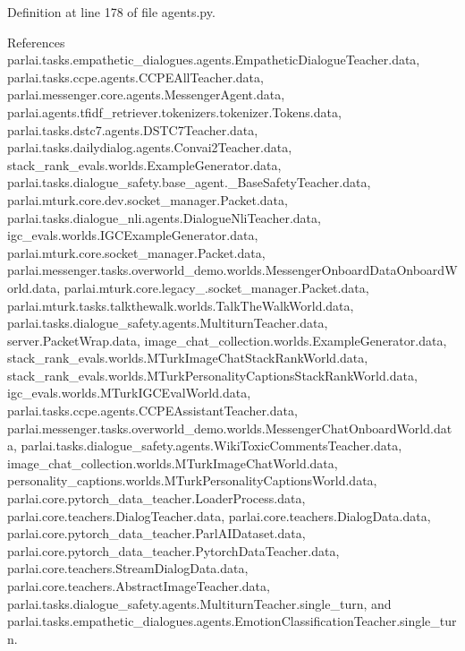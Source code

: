 Definition at line 178 of file agents.\+py.



References parlai.\+tasks.\+empathetic\+\_\+dialogues.\+agents.\+Empathetic\+Dialogue\+Teacher.\+data, parlai.\+tasks.\+ccpe.\+agents.\+C\+C\+P\+E\+All\+Teacher.\+data, parlai.\+messenger.\+core.\+agents.\+Messenger\+Agent.\+data, parlai.\+agents.\+tfidf\+\_\+retriever.\+tokenizers.\+tokenizer.\+Tokens.\+data, parlai.\+tasks.\+dstc7.\+agents.\+D\+S\+T\+C7\+Teacher.\+data, parlai.\+tasks.\+dailydialog.\+agents.\+Convai2\+Teacher.\+data, stack\+\_\+rank\+\_\+evals.\+worlds.\+Example\+Generator.\+data, parlai.\+tasks.\+dialogue\+\_\+safety.\+base\+\_\+agent.\+\_\+\+Base\+Safety\+Teacher.\+data, parlai.\+mturk.\+core.\+dev.\+socket\+\_\+manager.\+Packet.\+data, parlai.\+tasks.\+dialogue\+\_\+nli.\+agents.\+Dialogue\+Nli\+Teacher.\+data, igc\+\_\+evals.\+worlds.\+I\+G\+C\+Example\+Generator.\+data, parlai.\+mturk.\+core.\+socket\+\_\+manager.\+Packet.\+data, parlai.\+messenger.\+tasks.\+overworld\+\_\+demo.\+worlds.\+Messenger\+Onboard\+Data\+Onboard\+World.\+data, parlai.\+mturk.\+core.\+legacy\+\_.\+socket\+\_\+manager.\+Packet.\+data, parlai.\+mturk.\+tasks.\+talkthewalk.\+worlds.\+Talk\+The\+Walk\+World.\+data, parlai.\+tasks.\+dialogue\+\_\+safety.\+agents.\+Multiturn\+Teacher.\+data, server.\+Packet\+Wrap.\+data, image\+\_\+chat\+\_\+collection.\+worlds.\+Example\+Generator.\+data, stack\+\_\+rank\+\_\+evals.\+worlds.\+M\+Turk\+Image\+Chat\+Stack\+Rank\+World.\+data, stack\+\_\+rank\+\_\+evals.\+worlds.\+M\+Turk\+Personality\+Captions\+Stack\+Rank\+World.\+data, igc\+\_\+evals.\+worlds.\+M\+Turk\+I\+G\+C\+Eval\+World.\+data, parlai.\+tasks.\+ccpe.\+agents.\+C\+C\+P\+E\+Assistant\+Teacher.\+data, parlai.\+messenger.\+tasks.\+overworld\+\_\+demo.\+worlds.\+Messenger\+Chat\+Onboard\+World.\+data, parlai.\+tasks.\+dialogue\+\_\+safety.\+agents.\+Wiki\+Toxic\+Comments\+Teacher.\+data, image\+\_\+chat\+\_\+collection.\+worlds.\+M\+Turk\+Image\+Chat\+World.\+data, personality\+\_\+captions.\+worlds.\+M\+Turk\+Personality\+Captions\+World.\+data, parlai.\+core.\+pytorch\+\_\+data\+\_\+teacher.\+Loader\+Process.\+data, parlai.\+core.\+teachers.\+Dialog\+Teacher.\+data, parlai.\+core.\+teachers.\+Dialog\+Data.\+data, parlai.\+core.\+pytorch\+\_\+data\+\_\+teacher.\+Parl\+A\+I\+Dataset.\+data, parlai.\+core.\+pytorch\+\_\+data\+\_\+teacher.\+Pytorch\+Data\+Teacher.\+data, parlai.\+core.\+teachers.\+Stream\+Dialog\+Data.\+data, parlai.\+core.\+teachers.\+Abstract\+Image\+Teacher.\+data, parlai.\+tasks.\+dialogue\+\_\+safety.\+agents.\+Multiturn\+Teacher.\+single\+\_\+turn, and parlai.\+tasks.\+empathetic\+\_\+dialogues.\+agents.\+Emotion\+Classification\+Teacher.\+single\+\_\+turn.



